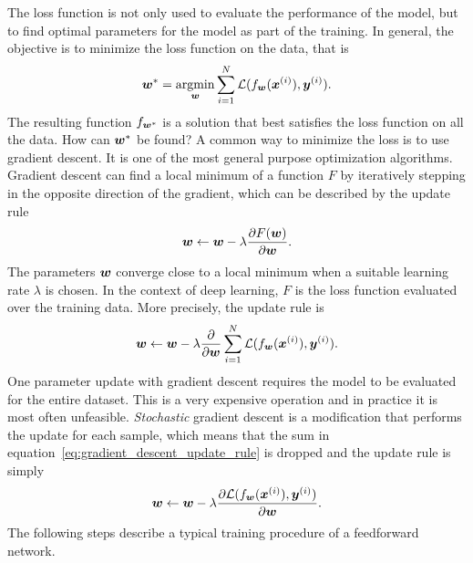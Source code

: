 		The loss function is not only used to evaluate the performance of the model, but to find optimal parameters for the model as part of the training.
		In general, the objective is to minimize the loss function on the data, that is
		\begin{equation}\label{eq:optimal_parameter_neural_network}
			\bm{w}^\ast = \operatorname*{argmin}_{\bm{w}} 
			\sum_{i = 1}^{N} 
				\mathcal{L}(f_{\bm{w}}(\bm{x}^{(i)}), \bm{y}^{(i)}).
		\end{equation}
		The resulting function $f_{\bm{w}^\ast}$ is a solution that best satisfies the loss function on all the data.
		How can $\bm{w}^\ast$ be found?
		A common way to minimize the loss is to use gradient descent.
		It is one of the most general purpose optimization algorithms.
		Gradient descent can find a local minimum of a function $F$ by iteratively stepping in the opposite direction of the gradient, which can be described by the update rule
		\begin{equation}
			\bm{w} \leftarrow 
			\bm{w} - \lambda \frac{\partial F(\bm{w})}{\partial \bm{w}}.
		\end{equation}
		The parameters $\bm{w}$ converge close to a local minimum when a suitable learning rate $\lambda$ is chosen. 
		In the context of deep learning, $F$ is the loss function evaluated over the training data.
		More precisely, the update rule is
		\begin{equation}\label{eq:gradient_descent_update_rule}
			\bm{w} \leftarrow 
			\bm{w} - \lambda 
			\frac{\partial}{\partial \bm{w}}
			\sum_{i = 1}^{N} 
				\mathcal{L}(f_{\bm{w}}(\bm{x}^{(i)}), \bm{y}^{(i)}).
		\end{equation}
		One parameter update with gradient descent requires the model to be evaluated for the entire dataset.
		This is a very expensive operation and in practice it is most often unfeasible.
		\emph{Stochastic} gradient descent is a modification that performs the update for each sample, which means that the sum in equation~\ref{eq:gradient_descent_update_rule} is dropped and the update rule is simply
		\begin{equation}\label{eq:stochastic_gradient_descent_update_rule}
			\bm{w} \leftarrow 
			\bm{w} - \lambda 
			\frac{\partial \mathcal{L}(f_{\bm{w}}(\bm{x}^{(i)}), \bm{y}^{(i)})}{\partial \bm{w}}.
		\end{equation}
		The following steps describe a typical training procedure of a feedforward network.
